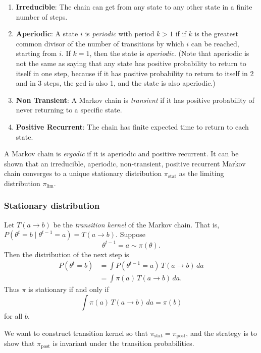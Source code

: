 \documentclass[11pt, titlepage]{article} %
\numberwithin{equation}{section}
\theoremstyle{definition}
\numberwithin{assumption}{section}
\begin{document}
\begin{enumerate}
    \item \textbf{Irreducible}: The chain can get from any state to any other state in a finite number of steps.
    \item \textbf{Aperiodic}: A state $i$ is \textit{periodic} with period $k>1$ if if $k$ is the greatest common divisor of the number of transitions by which $i$ can be reached, starting from $i$. If $k=1$, then the state is \textit{aperiodic}. (Note that aperiodic is not the same as saying that any state has positive probability to return to itself in one step, because if it has positive probability to return to itself in 2 and in 3 steps, the gcd is also 1, and the state is also aperiodic.)
    \item \textbf{Non Transient}: A Markov chain is \textit{transient} if it has positive probability of never returning to a specific state.
    \item \textbf{Positive Recurrent}: The chain has finite expected time to return to each state.
\end{enumerate}

A Markov chain is \textit{ergodic} if it is aperiodic and positive recurrent. It can be shown that an irreducible, aperiodic, non-transient, positive recurrent Markov chain converges to a unique stationary distribution $\pi_{\mathrm{stat}}$ as the limiting distribution $\pi_{\mathrm{lim}}$. 


\subsubsection*{Stationary distribution}
Let $T(a\to b)$ be the \textit{transition kernel} of the Markov chain. That is, $P(\theta^t=b\mid\theta^{t-1}=a)=T(a\to b)$.
Suppose
\begin{equation*}
    \theta^{t-1}=a \sim \pi(\theta).
\end{equation*}
Then the distribution of the next step is
\begin{align*}
    P(\theta^t=b)
    &=
    \int P(\theta^{t-1}=a)\,T(a\to b)\,da\\
    &=
    \int \pi(a)\,T(a\to b)\,da.
\end{align*}
Thus $\pi$ is stationary if and only if
\begin{equation*}
    \int \pi(a)\,T(a\to b)\,da=\pi(b)
\end{equation*}
for all $b$.

We want to construct transition kernel so that $\pi_{\mathrm{stat}}=\pi_{\mathrm{post}}$, and the strategy is to show that $\pi_{\mathrm{post}}$ is invariant under the transition probabilities. 
\end{document}
